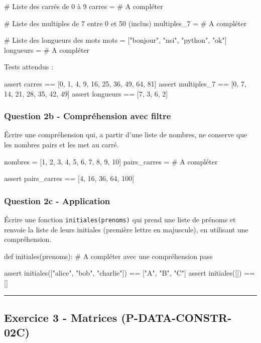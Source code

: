 \begin{python}
# Liste des carrés de 0 à 9
carres = # A compléter

# Liste des multiples de 7 entre 0 et 50 (inclus)
multiples_7 = # A compléter

# Liste des longueurs des mots
mots = ["bonjour", "nsi", "python", "ok"]
longueurs = # A compléter
\end{python}

Tests attendus :

\begin{python}
assert carres == [0, 1, 4, 9, 16, 25, 36, 49, 64, 81]
assert multiples_7 == [0, 7, 14, 21, 28, 35, 42, 49]
assert longueurs == [7, 3, 6, 2]
\end{python}

\subsubsection{Question 2b - Compréhension avec filtre}

Écrire une compréhension qui, a partir d'une liste de nombres, ne
conserve que les nombres pairs et les met au carré.

\begin{python}
nombres = [1, 2, 3, 4, 5, 6, 7, 8, 9, 10]
pairs_carres = # A compléter

assert pairs_carres == [4, 16, 36, 64, 100]
\end{python}

\subsubsection{Question 2c - Application}

Écrire une fonction \texttt{initiales(prenoms)} qui prend une liste de
prénoms et renvoie la liste de leurs initiales (première lettre en
majuscule), en utilisant une compréhension.

\begin{python}
def initiales(prenoms):
    # A compléter avec une compréhension
    pass

assert initiales(["alice", "bob", "charlie"]) == ["A", "B", "C"]
assert initiales([]) == []
\end{python}

\begin{center}\rule{0.5\linewidth}{0.5pt}\end{center}

\subsection{Exercice 3 - Matrices (P-DATA-CONSTR-02C)}

